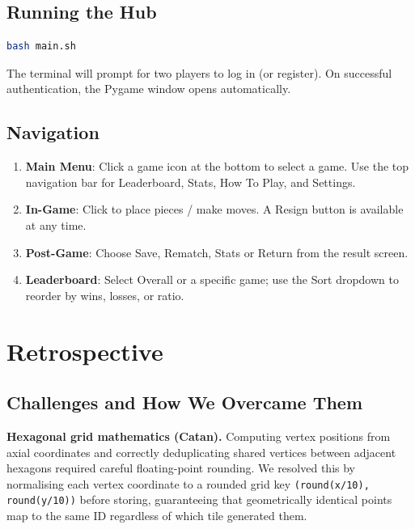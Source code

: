 \documentclass[12pt,a4paper]{article}
\begin{document}
\subsection{Running the Hub}

\begin{lstlisting}[language=bash, caption={Launching the game hub}]
bash main.sh
\end{lstlisting}

The terminal will prompt for two players to log in (or register). On successful authentication, the Pygame window opens automatically.

\subsection{Navigation}

\begin{enumerate}[leftmargin=2em]
  \item \textbf{Main Menu}: Click a game icon at the bottom to select a game. Use the top navigation bar for Leaderboard, Stats, How To Play, and Settings.
  \item \textbf{In-Game}: Click to place pieces / make moves. A Resign button is available at any time.
  \item \textbf{Post-Game}: Choose Save, Rematch, Stats or Return from the result screen.
  \item \textbf{Leaderboard}: Select Overall or a specific game; use the Sort dropdown to reorder by wins, losses, or ratio.
\end{enumerate}


\section{Retrospective}

\subsection{Challenges and How We Overcame Them}

\textbf{Hexagonal grid mathematics (Catan).}
Computing vertex positions from axial coordinates and correctly deduplicating shared vertices between adjacent hexagons required careful floating-point rounding. We resolved this by normalising each vertex coordinate to a rounded grid key \texttt{(round(x/10), round(y/10))} before storing, guaranteeing that geometrically identical points map to the same ID regardless of which tile generated them.
\end{document}
